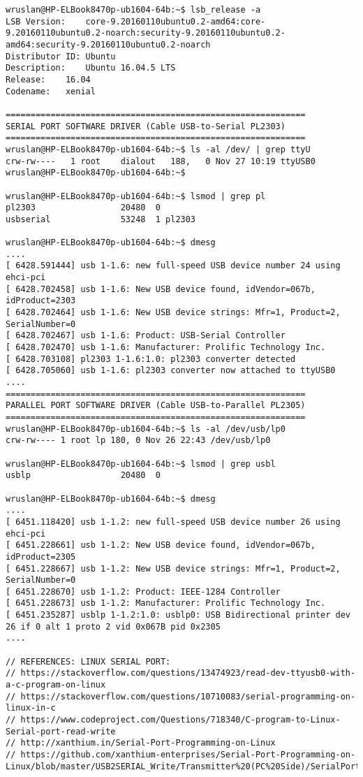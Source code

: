 \begin{lstlisting}[caption={App4-Concurrent Writes to Parallel and Serial Ports}, label=App4-Concurrent Writes to Parallel and Serial Ports]
wruslan@HP-ELBook8470p-ub1604-64b:~$ lsb_release -a
LSB Version:	core-9.20160110ubuntu0.2-amd64:core-9.20160110ubuntu0.2-noarch:security-9.20160110ubuntu0.2-amd64:security-9.20160110ubuntu0.2-noarch
Distributor ID:	Ubuntu
Description:	Ubuntu 16.04.5 LTS
Release:	16.04
Codename:	xenial

============================================================
SERIAL PORT SOFTWARE DRIVER (Cable USB-to-Serial PL2303)
============================================================
wruslan@HP-ELBook8470p-ub1604-64b:~$ ls -al /dev/ | grep ttyU
crw-rw----   1 root    dialout   188,   0 Nov 27 10:19 ttyUSB0
wruslan@HP-ELBook8470p-ub1604-64b:~$ 

wruslan@HP-ELBook8470p-ub1604-64b:~$ lsmod | grep pl
pl2303                 20480  0
usbserial              53248  1 pl2303

wruslan@HP-ELBook8470p-ub1604-64b:~$ dmesg
....
[ 6428.591444] usb 1-1.6: new full-speed USB device number 24 using ehci-pci
[ 6428.702458] usb 1-1.6: New USB device found, idVendor=067b, idProduct=2303
[ 6428.702464] usb 1-1.6: New USB device strings: Mfr=1, Product=2, SerialNumber=0
[ 6428.702467] usb 1-1.6: Product: USB-Serial Controller
[ 6428.702470] usb 1-1.6: Manufacturer: Prolific Technology Inc.
[ 6428.703108] pl2303 1-1.6:1.0: pl2303 converter detected
[ 6428.705060] usb 1-1.6: pl2303 converter now attached to ttyUSB0
....
============================================================
PARALLEL PORT SOFTWARE DRIVER (Cable USB-to-Parallel PL2305)
============================================================
wruslan@HP-ELBook8470p-ub1604-64b:~$ ls -al /dev/usb/lp0
crw-rw---- 1 root lp 180, 0 Nov 26 22:43 /dev/usb/lp0

wruslan@HP-ELBook8470p-ub1604-64b:~$ lsmod | grep usbl
usblp                  20480  0

wruslan@HP-ELBook8470p-ub1604-64b:~$ dmesg
....
[ 6451.118420] usb 1-1.2: new full-speed USB device number 26 using ehci-pci
[ 6451.228661] usb 1-1.2: New USB device found, idVendor=067b, idProduct=2305
[ 6451.228667] usb 1-1.2: New USB device strings: Mfr=1, Product=2, SerialNumber=0
[ 6451.228670] usb 1-1.2: Product: IEEE-1284 Controller
[ 6451.228673] usb 1-1.2: Manufacturer: Prolific Technology Inc.
[ 6451.235287] usblp 1-1.2:1.0: usblp0: USB Bidirectional printer dev 26 if 0 alt 1 proto 2 vid 0x067B pid 0x2305
....

// REFERENCES: LINUX SERIAL PORT:
// https://stackoverflow.com/questions/13474923/read-dev-ttyusb0-with-a-c-program-on-linux
// https://stackoverflow.com/questions/10710083/serial-programming-on-linux-in-c
// https://www.codeproject.com/Questions/718340/C-program-to-Linux-Serial-port-read-write
// http://xanthium.in/Serial-Port-Programming-on-Linux
// https://github.com/xanthium-enterprises/Serial-Port-Programming-on-Linux/blob/master/USB2SERIAL_Write/Transmitter%20(PC%20Side)/SerialPort_write.c


\end{lstlisting}
